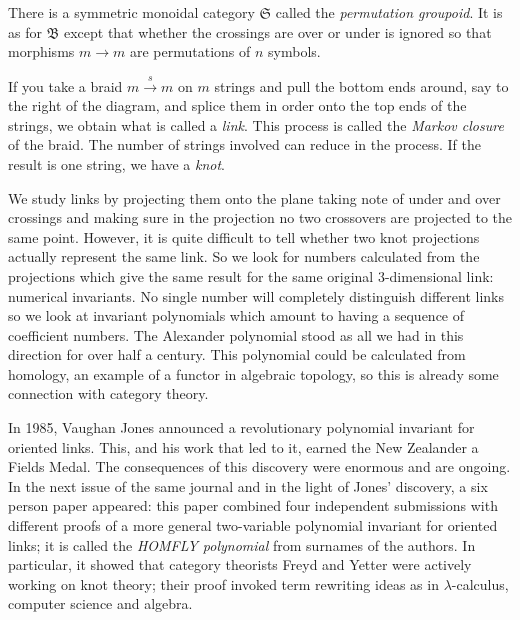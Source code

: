 \documentclass[a4paper,12pt]{article}
\theoremstyle{step}
\newcommand{\xra}{\xrightarrow}
\begin{document}
There is a symmetric monoidal category $\mathfrak{S}$ called the {\em permutation groupoid}.
It is as for $\mathfrak{B}$ except that whether the crossings are over or under is ignored so that morphisms $m\to m$ are permutations of $n$ symbols.  

If you take a braid $m\xra{s} m$ on $m$ strings and pull the bottom ends around, say to the right of the diagram, and splice them in order onto the top ends of the strings, we obtain what is called a {\em link}. This process is called the {\em Markov closure} of the braid. The number of
strings involved can reduce in the process. If the result is one string, we have a {\em knot}.

We study links by projecting them onto the plane taking note of under and over crossings
and making sure in the projection no two crossovers are projected to the same point. 
However, it is quite difficult to tell whether two knot projections actually represent the same 
link. So we look for numbers calculated from the projections which give the same result for
the same original 3-dimensional link: numerical invariants. No single number will completely
distinguish different links so we look at invariant polynomials which amount to having
a sequence of coefficient numbers. The Alexander polynomial \cite{Ale} stood as all we had
in this direction for over half a century. This polynomial could be calculated from
homology, an example of a functor in algebraic topology, so this is already some connection
with category theory.

In 1985, Vaughan Jones announced \cite{Jon} a revolutionary polynomial invariant for oriented links. This, and his work that led to it, earned the New Zealander a Fields Medal. The
consequences of this discovery were enormous and are ongoing. In the next issue of
the same journal and in the light of Jones' discovery, a six person paper \cite{HOMFLY} appeared: this paper combined four independent submissions with different proofs of a more general two-variable polynomial invariant for oriented links; it is called the {\em HOMFLY polynomial} from surnames of the authors. In particular, it showed that category theorists 
Freyd and Yetter were actively working on knot theory; their proof invoked term rewriting ideas as in $\lambda$-calculus, computer science and algebra. 
\end{document}
